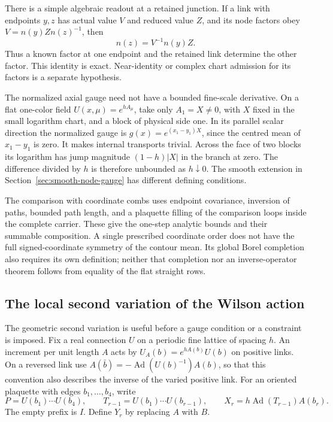 \documentclass[11pt,letterpaper,reqno]{amsart}
\numberwithin{equation}{section}
\theoremstyle{definition}
\theoremstyle{remark}
\begin{document}
There is a simple algebraic readout at a retained junction. If a
link with endpoints $y,z$ has actual value $V$ and reduced value
$Z$, and its node factors obey $V=n(y)Z n(z)^{-1}$, then
\begin{equation}\label{eq:junction-node-readout}
                         n(z)=V^{-1}n(y)Z.
\end{equation}
Thus a known factor at one endpoint and the retained link determine
the other factor. This identity is exact. Near-identity or complex
chart admission for its factors is a separate hypothesis.

The normalized axial gauge need not have a bounded fine-scale
derivative. On a flat one-color field $U(x,\mu)=e^{hA_\mu}$,
take only $A_1=X\ne0$, with $X$ fixed in the small logarithm chart,
and a block of physical side one. In its
parallel scalar direction the normalized gauge is
$g(x)=e^{(x_1-y_1)X}$, since the centred mean of $x_1-y_1$ is
zero. It makes internal transports trivial. Across the face of
two blocks its logarithm has jump magnitude $(1-h)|X|$ in the
branch at zero.
The difference divided by $h$ is therefore unbounded as $h\downarrow0$.
The smooth extension in Section~\ref{sec:smooth-node-gauge} has
different defining conditions.

The comparison with coordinate combs uses endpoint covariance,
inversion of paths, bounded path length, and a plaquette filling
of the comparison loops inside the complete carrier. These give
the one-step analytic bounds and their summable composition.
A single prescribed coordinate order does not have the full
signed-coordinate symmetry of the contour mean. Its global
Borel completion also requires its own definition; neither that
completion nor an inverse-operator theorem follows from equality
of the flat straight rows.

\subsection{The local second variation of the Wilson action}

The geometric second variation is useful before a gauge condition or a
constraint is imposed. Fix a real connection $U$ on a periodic fine
lattice of spacing $h$. An increment per unit length $A$ acts by
$U_A(b)=e^{hA(b)}U(b)$ on positive links. On a reversed link use
$A(\bar b)=-\operatorname{Ad}(U(b)^{-1})A(b)$, so that this convention
also describes the inverse of the varied positive link.
For an oriented plaquette with edges $b_1,\ldots,b_4$, write
\begin{equation}\label{eq:wilson-insertions}
 P=U(b_1)\cdots U(b_4),\qquad
 T_{r-1}=U(b_1)\cdots U(b_{r-1}),\qquad
 X_r=h\operatorname{Ad}(T_{r-1})A(b_r).
\end{equation}
The empty prefix is $I$. Define $Y_r$ by replacing $A$ with $B$.
\end{document}
